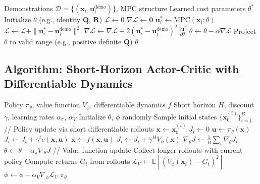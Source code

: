 \begin{algorithm}[H]
\caption{Inverse Optimal Control via Differentiable MPC}
\label{alg:inverse_oc}
\begin{algorithmic}[1]
\REQUIRE Demonstrations $\mathcal{D} = \{(\mathbf{x}_i, \mathbf{u}_i^{\text{demo}})\}$, MPC structure
\ENSURE Learned cost parameters $\theta^*$
\STATE Initialize $\theta$ (e.g., identity $\mathbf{Q}$, $\mathbf{R}$)
\REPEAT
    \STATE $\mathcal{L} \gets 0$
    \STATE $\nabla \mathcal{L} \gets \mathbf{0}$
        \STATE $\mathbf{u}_i^* \gets \text{MPC}(\mathbf{x}_i; \theta)$ 
        \STATE $\mathcal{L} \gets \mathcal{L} + \| \mathbf{u}_i^* - \mathbf{u}_i^{\text{demo}} \|^2$
        \STATE $\nabla \mathcal{L} \gets \nabla \mathcal{L} + 2(\mathbf{u}_i^* - \mathbf{u}_i^{\text{demo}})^T \frac{\partial \mathbf{u}^*}{\partial \theta}$ 
    \ENDFOR
    \STATE $\theta \gets \theta - \alpha \nabla \mathcal{L}$
    \STATE Project $\theta$ to valid range (e.g., positive definite $\mathbf{Q}$)
\RETURN $\theta$
\end{algorithmic}
\end{algorithm}

\subsection{Algorithm: Short-Horizon Actor-Critic with Differentiable Dynamics}

\begin{algorithm}[H]
\caption{SHAC: Short-Horizon Actor-Critic}
\label{alg:shac}
\begin{algorithmic}[1]
\REQUIRE Policy $\pi_\theta$, value function $V_\phi$, differentiable dynamics $f$
\REQUIRE Short horizon $H$, discount $\gamma$, learning rates $\alpha_\pi$, $\alpha_V$
\STATE Initialize $\theta$, $\phi$ randomly
\REPEAT
    \STATE Sample initial states $\{\mathbf{x}_0^{(i)}\}_{i=1}^{B}$
    \STATE // Policy update via short differentiable rollouts
        \STATE $\mathbf{x} \gets \mathbf{x}_0^{(i)}$
        \STATE $J_i \gets 0$
            \STATE $\mathbf{u} \gets \pi_\theta(\mathbf{x})$
            \STATE $J_i \gets J_i + \gamma^t c(\mathbf{x}, \mathbf{u})$
            \STATE $\mathbf{x} \gets f(\mathbf{x}, \mathbf{u})$
        \ENDFOR
        \STATE $J_i \gets J_i + \gamma^H V_\phi(\mathbf{x})$ 
    \ENDFOR
    \STATE $\nabla_\theta J \gets \frac{1}{B} \sum_i \nabla_\theta J_i$ 
    \STATE $\theta \gets \theta - \alpha_\pi \nabla_\theta J$
    \STATE // Value function update
    \STATE Collect longer rollouts with current policy
    \STATE Compute returns $G_t$ from rollouts
    \STATE $\mathcal{L}_V \gets \mathbb{E}[(V_\phi(\mathbf{x}_t) - G_t)^2]$
    \STATE $\phi \gets \phi - \alpha_V \nabla_\phi \mathcal{L}_V$
\RETURN $\pi_\theta$
\end{algorithmic}
\end{algorithm}

